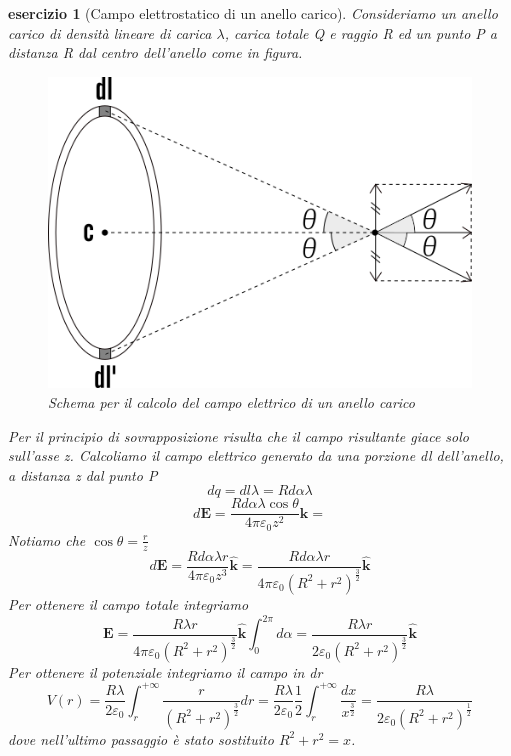 \documentclass[10pt,a4paper]{article}
\newtheorem{esercizio}{esercizio}
\begin{document}
\begin{esercizio}[Campo elettrostatico di un anello carico]
Consideriamo un anello carico di densità lineare di carica $\lambda$, carica totale Q e raggio R ed un punto P a distanza R dal centro dell'anello come in figura.
\begin{figure}[h!]
	\centering
	\includegraphics[width=0.6\linewidth]{images/anello}
	\caption{Schema per il calcolo del campo elettrico di un anello carico}
	\label{fig:anello}
\end{figure}
\FloatBarrier
Per il principio di sovrapposizione risulta che il campo risultante giace solo sull'asse z. Calcoliamo il campo elettrico generato da una porzione dl dell'anello, a distanza z dal punto P
\[dq = dl\lambda = R d\alpha \lambda\] 
\[d\mathbf{E} = \frac{ R d\alpha\lambda \cos\theta}{4\pi\varepsilon_0z^2}\hat{\mathbf{k}} = \]
Notiamo che $\cos\theta = \frac{r}{z}$
\[d\mathbf{E} = \frac{ R d\alpha\lambda r }{4\pi\varepsilon_0 z^3}\hat{\mathbf{k}} = \frac{ R d\alpha\lambda r }{4\pi\varepsilon_0 (R^2+r^2)^{\frac{3}{2}}}\hat{\mathbf{k}}\]
Per ottenere il campo totale integriamo 
\[\mathbf{E} = \frac{ R \lambda r }{4\pi\varepsilon_0 (R^2+r^2)^{\frac{3}{2}}}\hat{\mathbf{k}}\int_{0}^{2\pi}d\alpha= \frac{ R \lambda r }{2\varepsilon_0 (R^2+r^2)^{\frac{3}{2}}}\hat{\mathbf{k}} \]
Per ottenere il potenziale integriamo il campo in dr
\[V(r) = \frac{R \lambda}{2\varepsilon_0}\int_{r}^{+\infty}\frac{  r }{ (R^2+r^2)^{\frac{3}{2}}} dr= \frac{R \lambda}{2\varepsilon_0}\frac{1}{2}\int_{r}^{+\infty}\frac{ dx }{ x^{\frac{3}{2}}} = \frac{ R \lambda }{2\varepsilon_0 (R^2+r^2)^{\frac{1}{2}}}\]
dove nell'ultimo passaggio è stato sostituito \(R^2+r^2 = x\).
\end{esercizio}
\end{document}
